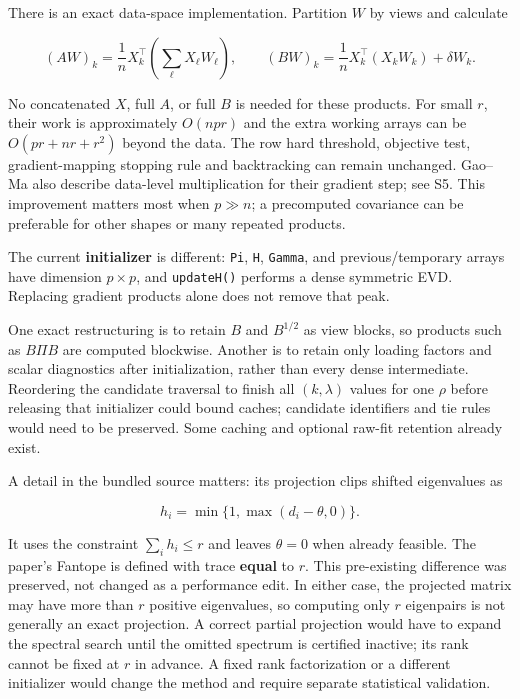 \documentclass[
  11pt,
]{article}
\begin{document}
There is an exact data-space implementation. Partition \(W\) by views
and calculate

\[
(AW)_k=\frac1nX_k^\top\left(\sum_\ell X_\ell W_\ell\right),
\qquad
(BW)_k=\frac1nX_k^\top(X_kW_k)+\delta W_k.
\tag{13}
\]

No concatenated \(X\), full \(A\), or full \(B\) is needed for these
products. For small \(r\), their work is approximately \(O(npr)\) and
the extra working arrays can be \(O(pr+nr+r^2)\) beyond the data. The
row hard threshold, objective test, gradient-mapping stopping rule and
backtracking can remain unchanged. Gao--Ma also describe data-level
multiplication for their gradient step; see S5. This improvement matters
most when \(p\gg n\); a precomputed covariance can be preferable for
other shapes or many repeated products.

The current \textbf{initializer} is different: \texttt{Pi}, \texttt{H},
\texttt{Gamma}, and previous/temporary arrays have dimension
\(p\times p\), and \texttt{updateH()} performs a dense symmetric EVD.
Replacing gradient products alone does not remove that peak.

One exact restructuring is to retain \(B\) and \(B^{1/2}\) as view
blocks, so products such as \(B\Pi B\) are computed blockwise. Another
is to retain only loading factors and scalar diagnostics after
initialization, rather than every dense intermediate. Reordering the
candidate traversal to finish all \((k,\lambda)\) values for one
\(\rho\) before releasing that initializer could bound caches; candidate
identifiers and tie rules would need to be preserved. Some caching and
optional raw-fit retention already exist.

A detail in the bundled source matters: its projection clips shifted
eigenvalues as

\[
h_i=\min\{1,\max(d_i-\theta,0)\}.
\]

It uses the constraint \(\sum_i h_i\leq r\) and leaves \(\theta=0\) when
already feasible. The paper's Fantope is defined with trace
\textbf{equal} to \(r\). This pre-existing difference was preserved, not
changed as a performance edit. In either case, the projected matrix may
have more than \(r\) positive eigenvalues, so computing only \(r\)
eigenpairs is not generally an exact projection. A correct partial
projection would have to expand the spectral search until the omitted
spectrum is certified inactive; its rank cannot be fixed at \(r\) in
advance. A fixed rank factorization or a different initializer would
change the method and require separate statistical validation.
\end{document}
